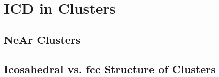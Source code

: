 \section{ICD in Clusters}

\subsection{NeAr Clusters}

\subsection{Icosahedral vs. fcc Structure of Clusters}
